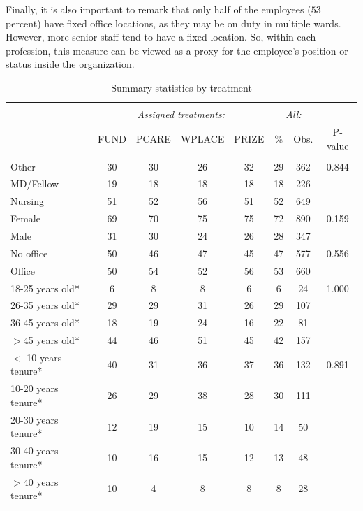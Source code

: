 \documentclass[12pt, titlepage]{article}
\begin{document}
Finally, it is also important to remark that only half of the employees
(\(53\) percent) have fixed office locations, as they may be on duty in
multiple wards. However, more senior staff tend to have a fixed
location. So, within each profession, this measure can be viewed as a
proxy for the employee's position or status inside the organization.

\begin{table}
\centering
\caption{Summary statistics by treatment}
\label{summary-statistics}
\begin{tabular}{@{}lccccccc}
  \\[-1.8ex]\hline \hline \\[-1.8ex]
 & \multicolumn{4}{c}{\emph{Assigned treatments:}} 
                        & \multicolumn{2}{c}{\emph{All:}}\\
                        \cmidrule(lr){2-5}\cmidrule(lr){6-7} & FUND & PCARE & WPLACE & PRIZE & \% & Obs. & P-value \\ 
  \hline \\[-1.86ex]
Other & 30 & 30 & 26 & 32 & 29 & 362 & 0.844 \\ 
  MD/Fellow & 19 & 18 & 18 & 18 & 18 & 226 &  \\ 
  Nursing & 51 & 52 & 56 & 51 & 52 & 649 &  \\ 
  [1.86ex] Female & 69 & 70 & 75 & 75 & 72 & 890 & 0.159 \\ 
  Male & 31 & 30 & 24 & 26 & 28 & 347 &  \\ 
  [1.86ex] No office & 50 & 46 & 47 & 45 & 47 & 577 & 0.556 \\ 
  Office & 50 & 54 & 52 & 56 & 53 & 660 &  \\ 
  [1.86ex] 18-25 years old* & 6 & 8 & 8 & 6 & 6 & 24 & 1.000 \\ 
  26-35 years old* & 29 & 29 & 31 & 26 & 29 & 107 &  \\ 
  36-45 years old* & 18 & 19 & 24 & 16 & 22 & 81 &  \\ 
  $>$45 years old* & 44 & 46 & 51 & 45 & 42 & 157 &  \\ 
  [1.86ex] $<$ 10 years tenure* & 40 & 31 & 36 & 37 & 36 & 132 & 0.891 \\ 
  10-20 years tenure* & 26 & 29 & 38 & 28 & 30 & 111 &  \\ 
  20-30 years tenure* & 12 & 19 & 15 & 10 & 14 & 50 &  \\ 
  30-40 years tenure* & 10 & 16 & 15 & 12 & 13 & 48 &  \\ 
  $>$40 years tenure* & 10 & 4 & 8 & 8 & 8 & 28 &  \\ 

\end{tabular}
\end{table}
\end{document}
